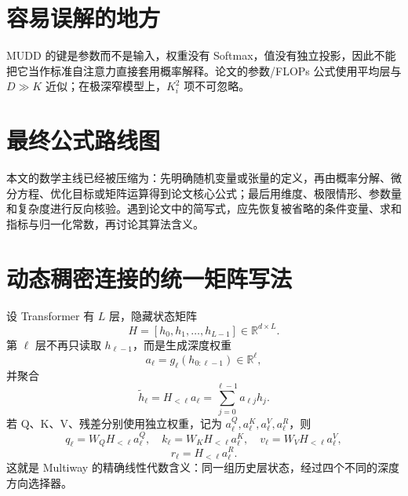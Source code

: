 \documentclass[UTF8,12pt,a4paper,fontset=none]{ctexart}
\numberwithin{equation}{section}
\newcommand{\R}{\mathbb{R}}
\begin{document}
\section{容易误解的地方}
\begin{criticalbox}
MUDD 的键是参数而不是输入，权重没有 Softmax，值没有独立投影，因此不能把它当作标准自注意力直接套用概率解释。论文的参数/FLOPs 公式使用平均层与 $D\gg K$ 近似；在极深窄模型上，$K_i^2$ 项不可忽略。
\end{criticalbox}
\section{最终公式路线图}
\begin{keybox}[阅读完成后应掌握]
本文的数学主线已经被压缩为：先明确随机变量或张量的定义，再由概率分解、微分方程、优化目标或矩阵运算得到论文核心公式；最后用维度、极限情形、参数量和复杂度进行反向核验。遇到论文中的简写式，应先恢复被省略的条件变量、求和指标与归一化常数，再讨论其算法含义。
\end{keybox}
\clearpage
\section{动态稠密连接的统一矩阵写法}
设 Transformer 有 $L$ 层，隐藏状态矩阵
\begin{equation}
 H=[h_0,h_1,\ldots,h_{L-1}]\in\R^{d\times L}.
\end{equation}
第 $\ell$ 层不再只读取 $h_{\ell-1}$，而是生成深度权重
\begin{equation}
 a_\ell=g_\ell(h_{0:\ell-1})\in\R^{\ell},
\end{equation}
并聚合
\begin{equation}
 \widetilde h_\ell=H_{<\ell}a_\ell
 =\sum_{j=0}^{\ell-1}a_{\ell j}h_j.
\end{equation}
若 Q、K、V、残差分别使用独立权重，记为 $a_\ell^Q,a_\ell^K,a_\ell^V,a_\ell^R$，则
\begin{equation}
 q_\ell=W_QH_{<\ell}a_\ell^Q,
 \quad
 k_\ell=W_KH_{<\ell}a_\ell^K,
 \quad
 v_\ell=W_VH_{<\ell}a_\ell^V,
\end{equation}
\begin{equation}
 r_\ell=H_{<\ell}a_\ell^R.
\end{equation}
这就是 Multiway 的精确线性代数含义：同一组历史层状态，经过四个不同的深度方向选择器。
\end{document}
